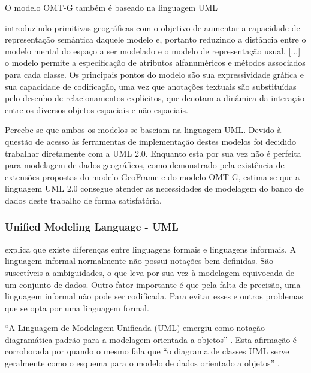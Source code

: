 O modelo OMT-G também é baseado na linguagem UML 
\begin{citacao}
    introduzindo primitivas geográficas com o objetivo de aumentar a capacidade de representação semântica daquele modelo e, portanto reduzindo a distância entre o modelo mental do espaço a ser modelado e o modelo de representação usual. [...] o modelo permite a especificação de atributos alfanuméricos e métodos associados para cada classe. Os principais pontos do modelo são sua expressividade gráfica e sua capacidade de codificação, uma vez que anotações textuais são substituídas pelo desenho de relacionamentos explícitos, que denotam a dinâmica da interação entre os diversos objetos espaciais e não espaciais.\cite[p.88]{borges2005modelagem}
\end{citacao}

Percebe-se que ambos os modelos se baseiam na linguagem UML. Devido à questão de acesso às ferramentas de implementação destes modelos foi decidido trabalhar diretamente com a UML 2.0. Enquanto esta por sua vez não é perfeita para modelagem de dados geográficos, como demonstrado pela existência de extensões propostas do modelo GeoFrame e do modelo OMT-G, estima-se que a linguagem UML 2.0 consegue atender as necessidades de modelagem do banco de dados deste trabalho de forma satisfatória.

\subsubsection{Unified Modeling Language - UML}\label{uml2.0}
 explica que existe diferenças entre linguagens formais e linguagens informais. A linguagem informal normalmente não possui notações bem definidas. São suscetíveis a ambiguidades, o que leva por sua vez à modelagem equivocada de um conjunto de dados. Outro fator importante é que pela falta de precisão, uma linguagem informal não pode ser codificada. Para evitar esses e outros problemas que se opta por uma linguagem formal.

``A Linguagem de Modelagem Unificada (UML) emergiu como notação diagramática padrão para a modelagem orientada a objetos'' \cite[p.9]{silva2007introuml}. Esta afirmação é corroborada por  quando o mesmo fala que ``o diagrama de classes UML serve geralmente como o esquema para o modelo de dados orientado a objetos'' \cite[p.9]{takai2005intro}.

